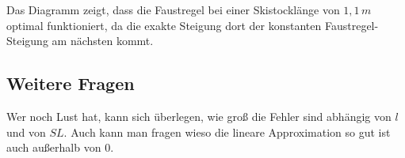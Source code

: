 Das Diagramm zeigt, dass die Faustregel bei einer Skistocklänge von $1{,}1 \, \unit{m}$ optimal funktioniert, da die exakte Steigung dort der konstanten Faustregel-Steigung am nächsten kommt.


\subsection*{Weitere Fragen}
Wer noch Lust hat, kann sich überlegen, wie groß die Fehler sind abhängig von $l$ und von $SL$. Auch kann man fragen wieso die lineare Approximation so gut ist auch außerhalb von $0$. 

